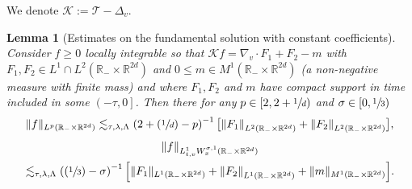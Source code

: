 \documentclass[JEP,XML,SOM,Unicode,NoFloatCountersInSection,published]{cedram}
\let\mathcal\mathscr
\newcommand{\Psfrac}[2]{(\sfrac{#1}{#2})}
\newtheorem{lemma}[theorem]{Lemma}
\theoremstyle{definition}
\theoremstyle{remark}
\newcommand\R{{\mathbb R}}
\newcommand{\cK}{\mathcal K}
\newcommand{\cT}{\mathcal T}
\begin{document}
We denote $\cK := \cT - \Delta_v$.
\begin{lemma}[Estimates on the fundamental solution with constant
coefficients]
\label{lem:Kolmogorov}
Consider $f \ge 0$ locally integrable so that
$\cK f = \nabla_v \cdot F_1 + F_2 - m$ with
$F_1,F_2 \in L^1 \cap L^2(\R_- \times \R^{2d})$ and
$0 \le m \in M^1(\R_- \times \R^{2d})$ (a non-negative measure
with finite mass) and where $F_1, F_2$ and $m$ have compact
support in time included in some $\left(-\tau,0\right]$. Then
there for any $p \in [2,2+\sfrac1d)$ and
$\sigma \in [0,\sfrac13)$
\begin{equation}
\label{eq:Kolm1}
\| f\|_{L^{p}(\R_- \times \R^{2d})}\lesssim_{\tau,\lambda,\Lambda}
\left(2+\Psfrac1d-p\right)^{-1}
\bigl[ \left\| F_1 \right\|_{L^2(\R_- \times \R^{2d})} +
\left\| F_2 \right\|_{L^2(\R_- \times \R^{2d})} \bigr],
\end{equation}
\begin{multline}\label{eq:Kolm2}
\| f\|_{L^1_{t,v} W^{\sigma,1}_x(\R_- \times \R^{2d})} \\
\lesssim_{\tau,\lambda,\Lambda}
\left(\Psfrac13-\sigma \right)^{-1} \Bigl[ \|
F_1 \|_{L^1(\R_- \times \R^{2d})} + \left\| F_2
\right\|_{L^1(\R_- \times \R^{2d})} + \| m \|_{M^1(\R_- \times
\R^{2d})} \Bigr].
\end{multline}
\end{lemma}
\end{document}
